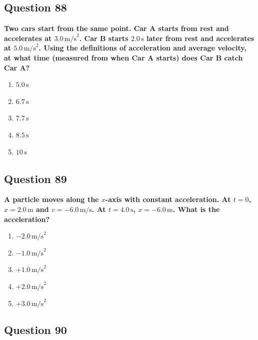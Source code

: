 \documentclass[12pt,letterpaper]{article}
\begin{document}
\subsection{Question 88}

\begin{questionbox}
\textbf{Two cars start from the same point. Car A starts from rest and accelerates at $3.0\,\text{m/s}^2$. Car B starts $2.0\,\text{s}$ later from rest and accelerates at $5.0\,\text{m/s}^2$. Using the definitions of acceleration and average velocity, at what time (measured from when Car A starts) does Car B catch Car A?}

\begin{enumerate}[label=\alph*)]
    \item $5.0\,\text{s}$
    \item $6.7\,\text{s}$
    \item $7.7\,\text{s}$
    \item $8.5\,\text{s}$
    \item $10\,\text{s}$
\end{enumerate}
\end{questionbox}

\subsection{Question 89}

\begin{questionbox}
\textbf{A particle moves along the $x$-axis with constant acceleration. At $t = 0$, $x = 2.0\,\text{m}$ and $v = -6.0\,\text{m/s}$. At $t = 4.0\,\text{s}$, $x = -6.0\,\text{m}$. What is the acceleration?}

\begin{enumerate}[label=\alph*)]
    \item $-2.0\,\text{m/s}^2$
    \item $-1.0\,\text{m/s}^2$
    \item $+1.0\,\text{m/s}^2$
    \item $+2.0\,\text{m/s}^2$
    \item $+3.0\,\text{m/s}^2$
\end{enumerate}
\end{questionbox}

\subsection{Question 90}
\end{document}
